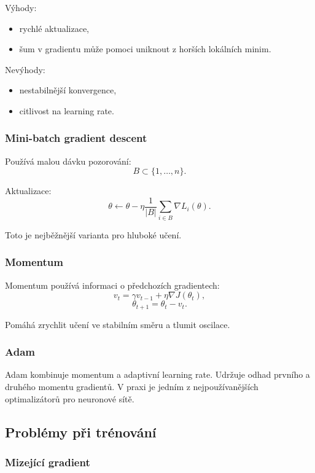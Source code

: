 Výhody:
\begin{itemize}
    \item rychlé aktualizace,
    \item šum v gradientu může pomoci uniknout z horších lokálních minim.
\end{itemize}

Nevýhody:
\begin{itemize}
    \item nestabilnější konvergence,
    \item citlivost na learning rate.
\end{itemize}

\subsubsection{Mini-batch gradient descent}

Používá malou dávku pozorování:
\[
B\subset \{1,\ldots,n\}.
\]

Aktualizace:
\[
\theta
\leftarrow
\theta
-
\eta
\frac{1}{|B|}
\sum_{i\in B}
\nabla L_i(\theta).
\]

Toto je nejběžnější varianta pro hluboké učení.

\subsubsection{Momentum}

Momentum používá informaci o předchozích gradientech:
\[
v_t = \gamma v_{t-1} + \eta \nabla J(\theta_t),
\]
\[
\theta_{t+1} = \theta_t - v_t.
\]

Pomáhá zrychlit učení ve stabilním směru a tlumit oscilace.

\subsubsection{Adam}

Adam kombinuje momentum a adaptivní learning rate. Udržuje odhad prvního a druhého momentu gradientů.
V praxi je jedním z nejpoužívanějších optimalizátorů pro neuronové sítě.

\subsection{Problémy při trénování}

\subsubsection{Mizející gradient}

